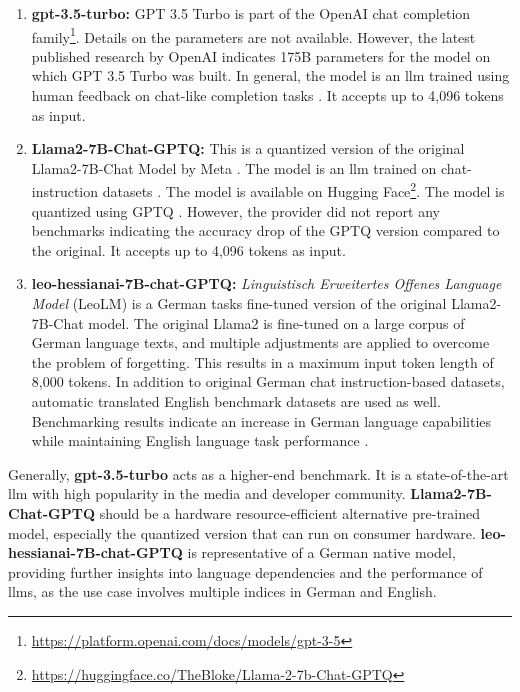 \begin{enumerate}
    \item \textbf{gpt-3.5-turbo:} GPT 3.5 Turbo is part of the OpenAI chat completion family\footnote{\url{https://platform.openai.com/docs/models/gpt-3-5}}. Details on the parameters are not available. However, the latest published research by OpenAI indicates 175B parameters for the model on which GPT 3.5 Turbo was built. In general, the model is an \gls{llm} trained using human feedback on chat-like completion tasks \cite{ouyang_training_2022}. It accepts up to 4,096 tokens as input.
    \item \textbf{Llama2-7B-Chat-GPTQ:} This is a quantized version of the original Llama2-7B-Chat Model by Meta \cite{touvron_llama_2023}. The model is an \gls{llm} trained on chat-instruction datasets \cite{ouyang_training_2022}. The model is available on Hugging Face\footnote{\url{https://huggingface.co/TheBloke/Llama-2-7b-Chat-GPTQ}}. The model is quantized using GPTQ \cite{muennighoff_sgpt_2022}. However, the provider did not report any benchmarks indicating the accuracy drop of the GPTQ version compared to the original. It accepts up to 4,096 tokens as input.
    \item \textbf{leo-hessianai-7B-chat-GPTQ:} \textit{Linguistisch Erweitertes Offenes Language Model} (LeoLM) is a German tasks fine-tuned version of the original Llama2-7B-Chat model. The original Llama2 is fine-tuned on a large corpus of German language texts, and multiple adjustments are applied to overcome the problem of forgetting. This results in a maximum input token length of 8,000 tokens. In addition to original German chat instruction-based datasets, automatic translated English benchmark datasets are used as well. Benchmarking results indicate an increase in German language capabilities while maintaining English language task performance \cite{pluster_leolm_nodate}.
\end{enumerate}

Generally, \textbf{gpt-3.5-turbo} acts as a higher-end benchmark. It is a state-of-the-art \gls{llm} with high popularity in the media and developer community. \textbf{Llama2-7B-Chat-GPTQ} should be a hardware resource-efficient alternative pre-trained model, especially the quantized version that can run on consumer hardware. \textbf{leo-hessianai-7B-chat-GPTQ} is representative of a German native model, providing further insights into language dependencies and the performance of \gls{llm}s, as the use case involves multiple indices in German and English.

